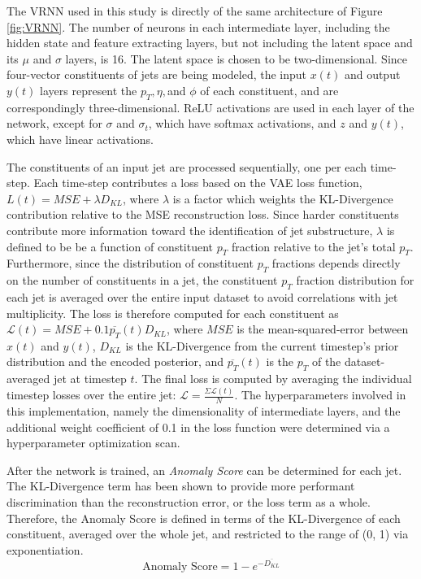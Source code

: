 \documentclass[12pt, a4paper]{article}
\begin{document}
The VRNN used in this study is directly of the same architecture of Figure \ref{fig:VRNN}. The number of neurons in each intermediate layer, including the hidden state and feature extracting layers, but not including the latent space and its $\mu$ and $\sigma$ layers, is 16. The latent space is chosen to be two-dimensional. Since four-vector constituents of jets are being modeled, the input $x(t)$ and output $y(t)$ layers represent the $p_{T}, \eta, $and $\phi$ of each constituent, and are correspondingly three-dimensional. ReLU activations are used in each layer of the network, except for $\sigma$ and $\sigma_{t}$, which have softmax activations, and $z$ and $y(t)$, which have linear activations. 

The constituents of an input jet are processed sequentially, one per each time-step. 
Each time-step contributes a loss based on the VAE loss function, $L(t) = MSE + \lambda D_{KL}$, where $\lambda$ is a factor which weights the KL-Divergence contribution relative to the MSE reconstruction loss.
Since harder constituents contribute more information toward the identification of jet substructure, $\lambda$ is defined to be be a function of constituent $p_{T}$ fraction relative to the jet's total $p_{T}$. 
Furthermore, since the distribution of constituent $p_{T}$ fractions depends directly on the number of constituents in a jet, the constituent $p_{T}$ fraction distribution for each jet is averaged over the entire input dataset to avoid correlations with jet multiplicity. The loss is therefore computed for each constituent as $\mathcal{L}(t)=MSE+0.1\overline{p_T}(t)D_{KL}$, where $MSE$ is the mean-squared-error between $x(t)$ and $y(t)$, $D_{KL}$ is the KL-Divergence from the current timestep's prior distribution and the encoded posterior, and $\overline{p_T}(t)$ is the $p_T$ of the dataset-averaged jet at timestep $t$. The final loss is computed by averaging the individual timestep losses over the entire jet: $\mathcal{L} = \frac{\Sigma \mathcal{L}(t)}{N}$. The hyperparameters involved in this implementation, namely the dimensionality of intermediate layers, and the additional weight coefficient of 0.1 in the loss function were determined via a hyperparameter optimization scan. 

After the network is trained, an \textit{Anomaly Score} can be determined for each jet. The KL-Divergence term has been shown to provide more performant discrimination than the reconstruction error, or the loss term as a whole. Therefore, the Anomaly Score is defined in terms of the KL-Divergence of each constituent, averaged over the whole jet, and restricted to the range of (0, 1) via exponentiation. 
\begin{equation}
	\text{Anomaly Score} = 1 - e^{-\overline{D_{KL}}}
\end{equation}
\end{document}
